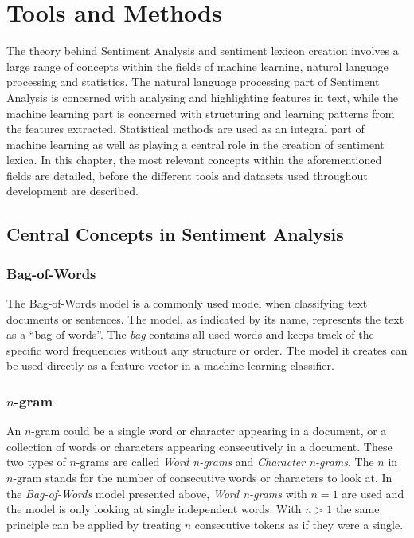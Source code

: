\chapter{Tools and Methods}
\label{cha:tools_and_methods}
The theory behind Sentiment Analysis and sentiment lexicon creation involves a large range of concepts within the fields of machine learning, natural language processing and statistics. The natural language processing part of Sentiment Analysis is concerned with analysing and highlighting features in text, while the machine learning part is concerned with structuring and learning patterns from the features extracted. Statistical methods are used as an integral part of machine learning as well as playing a central role in the creation of sentiment lexica. In this chapter, the most relevant concepts within the aforementioned fields are detailed, before the different tools and datasets used throughout development are described. 

\section{Central Concepts in Sentiment Analysis}
\label{sec:background_nlp}

\subsection*{Bag-of-Words}
The Bag-of-Words model is a commonly used model when classifying text documents or sentences. The model, as indicated by its name, represents the text as a ``bag of words''. The \textit{bag} contains all used words and keeps track of the specific word frequencies without any structure or order. The model it creates can be used directly as a feature vector in a machine learning classifier.

\subsection*{$n$-gram}
An $n$-gram could be a single word or character appearing in a document, or a collection of words or characters appearing consecutively in a document. These two types of $n$-grams are called \textit{Word n-grams} and \textit{Character n-grams}. The $n$ in $n$-gram stands for the number of consecutive words or characters to look at.  In the \textit{Bag-of-Words} model presented above, \textit{Word n-grams} with $n = 1$ are used and the model is only looking at single independent words. With $n>1$ the same principle can be applied by treating $n$ consecutive tokens as if they were a single. 

